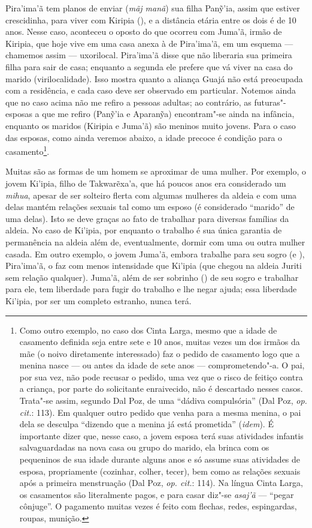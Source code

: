 Pira'ima'ã tem planos de enviar (\emph{mãj manã}) sua filha Panỹ'ia,
assim que estiver crescidinha, para viver com Kiripia (), e a
distância etária entre os dois é de 10 anos. Nesse caso, aconteceu o
oposto do que ocorreu com Juma'ã, irmão de Kiripia, que hoje vive em uma
casa anexa à de Pira'ima'ã, em um esquema --- chamemos assim --- uxorilocal.
Pira'ima'ã disse que não liberaria sua primeira filha para sair de casa;
enquanto a segunda ele prefere que vá viver na casa do marido
(virilocalidade). Isso mostra quanto a aliança Guajá não está preocupada
com a residência, e cada caso deve ser observado em particular. Notemos
ainda que no caso acima não me refiro a pessoas adultas; ao contrário,
as futuras"-esposas a que me refiro (Panỹ'ia e Aparanỹa) encontram"-se
ainda na infância, enquanto os maridos (Kiripia e Juma'ã) são meninos
muito jovens. Para o caso das esposas, como ainda veremos abaixo, a
idade precoce é condição para o casamento\footnote{Como outro exemplo,
  no caso dos Cinta Larga, mesmo que a idade de casamento definida seja
  entre sete e 10 anos, muitas vezes um dos irmãos da mãe (o noivo
  diretamente interessado) faz o pedido de casamento logo que a menina
  nasce --- ou antes da idade de sete anos --- comprometendo"-a. O pai, por
  sua vez, não pode recusar o pedido, uma vez que o risco de feitiço
  contra a criança, por parte do solicitante enraivecido, não é
  descartado nesses casos. Trata"-se assim, segundo Dal Poz, de uma
  ``dádiva compulsória'' (Dal Poz, \emph{op. cit.}: 113). Em qualquer outro
  pedido que venha para a mesma menina, o pai dela se desculpa ``dizendo
  que a menina já está prometida'' (\emph{idem}). É importante dizer que, nesse
  caso, a jovem esposa terá suas atividades infantis salvaguardadas na
  nova casa ou grupo do marido, ela brinca com os pequeninos de sua
  idade durante alguns anos e só assume suas atividades de esposa,
  propriamente (cozinhar, colher, tecer), bem como as relações sexuais
  após a primeira menstruação (Dal Poz, \emph{op. cit.}: 114). Na língua Cinta
  Larga, os casamentos são literalmente pagos, e para casar diz"-se
  \emph{asaj'ã} --- ``pegar cônjuge''. O pagamento muitas vezes é feito
  com flechas, redes, espingardas, roupas, munição.}.

Muitas são as formas de um homem se aproximar de uma mulher. Por
exemplo, o jovem Ki'ipia, filho de Takwarẽxa'a, que há poucos anos era
considerado um \emph{mihua}, apesar de ser solteiro flerta com algumas
mulheres da aldeia e com uma delas mantém relações sexuais tal como um
esposo (é considerado ``marido'' de uma delas). Isto se deve graças ao
fato de trabalhar para diversas famílias da aldeia. No caso de Ki'ipia,
por enquanto o trabalho é sua única garantia de permanência na aldeia
além de, eventualmente, dormir com uma ou outra mulher casada. Em outro
exemplo, o jovem Juma'ã, embora trabalhe para seu sogro (e ),
Pira'ima'ã, o faz com menos intensidade que Ki'ipia (que chegou na
aldeia Juriti sem relação qualquer). Juma'ã, além de ser sobrinho ()
de seu sogro e trabalhar para ele, tem liberdade para fugir do trabalho
e lhe negar ajuda; essa liberdade Ki'ipia, por ser um completo estranho,
nunca terá.

